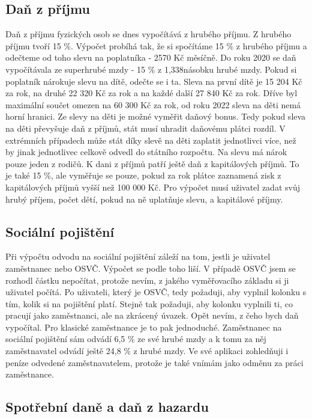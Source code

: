 \documentclass[11pt,a4paper,twoside,openright]{report}
\begin{document}
\subsection{Daň z příjmu}

Daň z příjmu fyzických osob se dnes vypočítává z hrubého příjmu. Z hrubého příjmu tvoří
15 \%. Výpočet probíhá tak, že si spočítáme 15 \% z hrubého příjmu a odečteme od toho
slevu na poplatníka - 2570 Kč měsíčně. Do roku 2020 se daň vypočítávala ze superhrubé mzdy
- 15 \% z 1,338násobku hrubé mzdy. Pokud si poplatník nárokuje slevu na dítě, odečte se i ta.
Sleva na první dítě je 15 204 Kč za rok, na druhé 22 320 Kč za rok a na každé další 27 840 Kč za rok. 
Dříve byl maximální součet omezen na 60 300 Kč za rok, od roku 2022 sleva na děti nemá horní
hranici. Ze slevy na děti je možné vyměřit daňový bonus. Tedy pokud sleva na děti převyšuje daň
z příjmů, stát musí uhradit daňovému plátci rozdíl. V extrémních případech může stát díky
slevě na děti zaplatit jednotlivci více, než by jinak jednotlivec celkově odvedl do státního
rozpočtu. Na slevu má nárok pouze jeden z rodičů. K dani z příjmů patří ještě daň z kapitálových
příjmů. To je také 15 \%, ale vyměřuje se pouze, pokud za rok plátce zaznamená zisk z kapitálových
příjmů vyšší než 100 000 Kč. Pro výpočet musí uživatel zadat svůj hrubý příjem, počet dětí,
pokud na ně uplatňuje slevu, a kapitálové příjmy.

\subsection{Sociální pojištění}

Při výpočtu odvodu na sociální pojištění záleží na tom, jestli je uživatel zaměstnanec nebo OSVČ.
Výpočet se podle toho liší. V případě OSVČ jsem se rozhodl částku nepočítat, protože nevím, z
jakého vyměřovacího základu si ji uživatel počítá. Po uživateli, který je OSVČ, tedy
požaduji, aby vyplnil kolonku s tím, kolik si na pojištění platí. Stejně tak požaduji, aby
kolonku vyplnili ti, co pracují jako zaměstnanci, ale na zkrácený úvazek. Opět nevím, z čeho
bych daň vypočítal. Pro klasické zaměstnance je to pak jednoduché. Zaměstnanec  na sociální
pojištění sám odvádí 6,5 \% ze své hrubé mzdy a k tomu za něj zaměstnavatel odvádí ještě
24,8 \% z hrubé mzdy. Ve své aplikaci zohledňuji i peníze odvedené zaměstnavatelem, protože
je také vnímám jako odměnu za práci zaměstnance.

\subsection{Spotřební daně a daň z hazardu}
\end{document}
